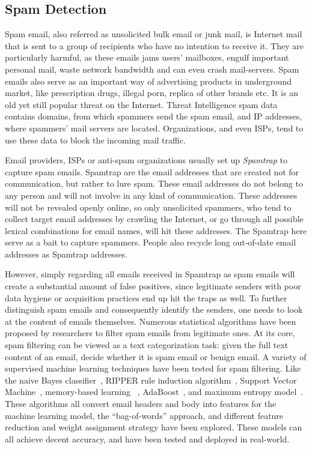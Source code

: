 \subsection{Spam Detection}
Spam email, also referred as unsolicited bulk email or junk mail, is 
Internet mail that is sent to a group of recipients who have no intention 
to receive it. They are particularly harmful, as these emails jams users' 
mailboxes, engulf important personal mail, waste network bandwidth and 
can even crash mail-servers. Spam emails also serve as an important
way of advertising products in underground market, like prescription drugs, 
illegal porn, replica of other brands etc. It is an old yet still popular
threat on the Internet. Threat Intelligence spam data contains domains, 
from which spammers send the spam email, and IP addresses, where spammers' 
mail servers are located. Organizations, and even ISPs, tend to use these 
data to block the incoming mail traffic.

Email providers, ISPs or anti-spam organizations usually set up 
\textit{Spamtrap} to capture spam emails. Spamtrap are the email addresses
that are created not for communication, but rather to lure spam. These
email addresses do not belong to any person and will not involve in any
kind of communication. These addresses will not be revealed openly online,
so only unsolicited spammers, who tend to collect target email addresses
by crawling the Internet, or go through all possible lexical combinations
for email names, will hit these addresses. The Spamtrap here serve as a 
bait to capture spammers. People also recycle long out-of-date email 
addresses as Spamtrap addresses. 

However, simply regarding all emails received in Spamtrap as spam emails 
will create a substantial amount of false positives, since legitimate 
senders with poor data hygiene or acquisition practices end up hit the traps 
as well. To further distinguish spam emails and consequently identify the
senders, one needs to look at the content of emails themselves. Numerous 
statistical algorithms have been proposed by researchers to filter spam
emails from legitimate ones. At its core, spam filtering can be viewed as
a text categorization task: given the full text content of an email, 
decide whether it is spam email or benign email. A variety of supervised
machine learning techniques have been tested for spam filtering. Like the
naive Bayes classifier~\cite{androutsopoulos2000evaluation, sahami1998bayesian, schneider2003comparison}, 
RIPPER rule induction algorithm~\cite{cohen1996learning},
Support Vector Machine~\cite{drucker1999support}, memory-based learning
~\cite{androutsopoulos2000learning}, AdaBoost~\cite{carreras2001boosting},
and maximum entropy model~\cite{zhang2003filtering}. These algorithms all
convert email headers and body into features for the machine learning model, 
the ``bag-of-words'' approach,
and different feature reduction and weight assignment strategy have been
explored. These models can all achieve decent accuracy, and have been tested
and deployed in real-world. 

